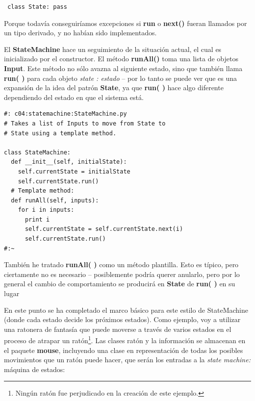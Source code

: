 \documentclass{article}
\begin{document}
 \begin{lstlisting}
 class State: pass
 \end{lstlisting}
 
 Porque todavía conseguiríamos excepciones si \textbf{run} o \textbf{next()} fueran llamados por un tipo derivado, y no habían sido implementados. \newline
 
El \textbf{StateMachine} hace un seguimiento de la situación actual, el cual es inicializado por el constructor. El método \textbf{runAll()} toma una lista de objetos \textbf{Input}. Este método no sólo avazna al siguiente estado, sino que también llama \textbf{run( )} para cada objeto \textit{state : estado} – por lo tanto se puede ver que es una expansión de la idea del patrón \textbf{State}, ya que \textbf{run( )} hace algo diferente dependiendo del estado en que el sistema está.    \newline

\begin{lstlisting}
#: c04:statemachine:StateMachine.py 
# Takes a list of Inputs to move from State to  
# State using a template method. 

class StateMachine: 
  def __init__(self, initialState): 
    self.currentState = initialState 
    self.currentState.run() 
  # Template method: 
  def runAll(self, inputs): 
    for i in inputs: 
      print i 
      self.currentState = self.currentState.next(i) 
      self.currentState.run() 
#:~ 
\end{lstlisting}

También he tratado \textbf{runAll( )} como un método plantilla. Esto es típico, pero ciertamente no es necesario – posiblemente podría querer
anularlo, pero por lo general el cambio de comportamiento se producirá en \textbf{State} de \textbf{run( )} en su lugar       \newline

En este punto se ha completado el marco básico para este estilo de StateMachine (donde cada estado decide los próximos estados). Como ejemplo, voy a utilizar una ratonera de fantasía que puede moverse a través de varios estados en el proceso de atrapar un ratón\footnote{Ningún ratón fue perjudicado en la creación de este ejemplo.}. Las clases ratón y la información se almacenan en el paquete \textbf{mouse}, incluyendo una clase en representación de todas los posibles movimientos que un ratón puede hacer, que serán los entradas a la \textit{state machine:} máquina de estados:       \newline
\end{document}
